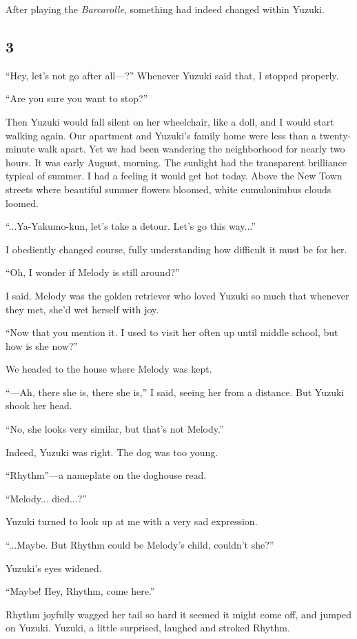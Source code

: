 \documentclass[
    a4paper,
    12pt,
    twoside,
    openany,
    UTF8,
    fontset=windows
]{ctexbook}
\begin{document}
After playing the \textit{Barcarolle}, something had indeed changed within Yuzuki.


\subsection*{3}

``Hey, let's not go after all---?'' Whenever Yuzuki said that, I stopped properly.

``Are you sure you want to stop?''

Then Yuzuki would fall silent on her wheelchair, like a doll, and I would start walking again. Our apartment and Yuzuki's family home were less than a twenty-minute walk apart. Yet we had been wandering the neighborhood for nearly two hours. It was early August, morning. The sunlight had the transparent brilliance typical of summer. I had a feeling it would get hot today. Above the New Town streets where beautiful summer flowers bloomed, white cumulonimbus clouds loomed.

``...Ya-Yakumo-kun, let's take a detour. Let's go this way...''

I obediently changed course, fully understanding how difficult it must be for her.

``Oh, I wonder if Melody is still around?''

I said. Melody was the golden retriever who loved Yuzuki so much that whenever they met, she'd wet herself with joy.

``Now that you mention it. I used to visit her often up until middle school, but how is she now?''

We headed to the house where Melody was kept.

``---Ah, there she is, there she is,'' I said, seeing her from a distance. But Yuzuki shook her head.

``No, she looks very similar, but that's not Melody.''

Indeed, Yuzuki was right. The dog was too young.

``Rhythm''---a nameplate on the doghouse read.

``Melody... died...?''

Yuzuki turned to look up at me with a very sad expression.

``...Maybe. But Rhythm could be Melody's child, couldn't she?''

Yuzuki's eyes widened.

``Maybe! Hey, Rhythm, come here.''

Rhythm joyfully wagged her tail so hard it seemed it might come off, and jumped on Yuzuki. Yuzuki, a little surprised, laughed and stroked Rhythm.
\end{document}
